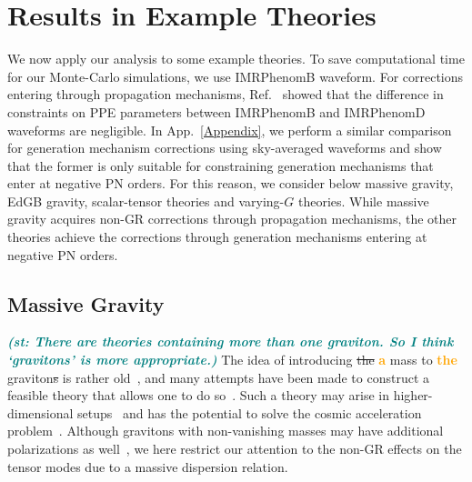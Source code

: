 \documentclass[prd,twocolumn,nofootinbib]{revtex4-1}
\newcommand{\shammi}[1]{\textcolor{teal}{\it{\textbf{(st: #1)}}} }
\newcommand{\zack}[1]{\textcolor{orange}{\textbf{#1}} }
\begin{document}
\section{Results in Example Theories}\label{results}

We now apply our analysis to some example theories. To save computational time for our Monte-Carlo simulations, we use IMRPhenomB waveform. For corrections entering through propagation mechanisms, Ref.~\cite{Yunes:2016jcc} showed that the difference in constraints on PPE parameters between IMRPhenomB and IMRPhenomD waveforms are negligible. In App.~\ref{Appendix}, we perform a similar comparison for generation mechanism corrections using sky-averaged waveforms and show that the former is only suitable for constraining generation mechanisms that enter at negative PN orders. For this reason, we consider below massive gravity, EdGB gravity, scalar-tensor theories and varying-$G$ theories. While massive gravity acquires non-GR corrections through propagation mechanisms, the other theories achieve the corrections through generation mechanisms entering at negative PN orders.



\subsection{Massive Gravity}
\label{sec:massive}
\shammi{There are theories containing more than one graviton. So I think `gravitons' is more appropriate.}
The idea of introducing \sout{the} \zack{a} mass to \zack{the} graviton\sout{s} is rather old~\cite{Fierz:1939ix}, and many attempts have been made to construct a feasible theory that allows one to do so~\cite{deRham:2014zqa}.  Such a theory may arise in higher-dimensional setups~\cite{Hinterbichler:2011tt} and has the potential to solve the cosmic acceleration problem~\cite{deRham:2014zqa}. Although gravitons with non-vanishing masses may have additional polarizations as well~\cite{dePaula:2004bc}, we here restrict our attention to the non-GR effects on the tensor modes due to a massive dispersion relation.

\end{document}
